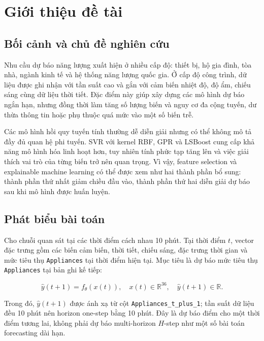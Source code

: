 \chapter{Giới thiệu đề tài}\label{chap:7}

\section{Bối cảnh và chủ đề nghiên cứu}\label{bux1ed1i-cux1ea3nh-vuxe0-chux1ee7-ux111ux1ec1-nghiuxean-cux1ee9u}

Nhu cầu dự báo năng lượng xuất hiện ở nhiều cấp độ: thiết bị, hộ gia đình, tòa nhà, ngành kinh tế và hệ thống năng lượng quốc gia. Ở cấp độ công trình, dữ liệu được ghi nhận với tần suất cao và gắn với cảm biến nhiệt độ, độ ẩm, chiếu sáng cùng dữ liệu thời tiết. Đặc điểm này giúp xây dựng các mô hình dự báo ngắn hạn, nhưng đồng thời làm tăng số lượng biến và nguy cơ đa cộng tuyến, dư thừa thông tin hoặc phụ thuộc quá mức vào một số biến trễ.

Các mô hình hồi quy tuyến tính thường dễ diễn giải nhưng có thể không mô tả đầy đủ quan hệ phi tuyến. SVR với kernel RBF, GPR và LSBoost cung cấp khả năng mô hình hóa linh hoạt hơn, tuy nhiên tính phức tạp tăng lên và việc giải thích vai trò của từng biến trở nên quan trọng. Vì vậy, feature selection và explainable machine learning có thể được xem như hai thành phần bổ sung: thành phần thứ nhất giảm chiều đầu vào, thành phần thứ hai diễn giải dự báo sau khi mô hình được huấn luyện.

\section{Phát biểu bài toán}\label{phuxe1t-biux1ec3u-buxe0i-touxe1n}

Cho chuỗi quan sát tại các thời điểm cách nhau 10 phút. Tại thời điểm $t$, vector đặc trưng gồm các biến cảm biến, thời tiết, chiếu sáng, đặc trưng thời gian và mức tiêu thụ \texttt{Appliances} tại thời điểm hiện tại. Mục tiêu là dự báo mức tiêu thụ \texttt{Appliances} tại bản ghi kế tiếp:

\begin{equation}
    \hat{y}(t+1) = f_{\theta}(x(t)),
    \quad x(t) \in \mathbb{R}^{36},
    \quad \hat{y}(t+1) \in \mathbb{R}.
    \label{eq:forecast}
\end{equation}

Trong đó, $\hat{y}(t+1)$ được ánh xạ từ cột
\texttt{Appliances\_t\_plus\_1}; tần suất dữ liệu đều 10 phút nên
horizon one-step bằng 10 phút. Đây là dự báo điểm cho một thời điểm
tương lai, không phải dự báo multi-horizon $H$-step như một số bài toán
forecasting dài hạn.

